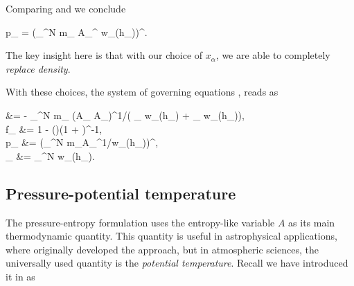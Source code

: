 \documentclass[../main.tex]{subfiles}
\begin{document}
Comparing  and  we conclude

\begin{equations}[single,!,numberline=all]
	\label{eq:PRESSURE-ENTROPY-PRESSURE}
	p_{\alpha} = \left(\sum_{}^N m_{\beta} A_{\beta}^{} w_{\alpha\beta}(h_{\alpha})\right)^{\gamma}.
\end{equations}

The key insight here is that with our choice of $x_{\alpha}$, we are able to completely \emph{replace density}.

With these choices, the system of governing equations ,  reads as

\begin{equations}[columns,!,numberline=all]
	\label{eq:PRESSURE-ENTROPY-TOTAL}
	 &= - \sum_{}^N m_{\beta} \left(A_{\alpha} A_{\beta}\right)^{1/\gamma}\left( \nabla_{\alpha} w_{\alpha\beta}\left(h_{\alpha}\right) +  \nabla_{\alpha} w_{\alpha\beta}\left(h_{\beta}\right)\right), \\
	f_{\alpha \beta} &= 1 - \left(\right)\left(1 + \right)^{-1}, \\
	p_{\alpha} &= \left(\sum_{}^N m_{\beta}A_{\beta}^{1/\gamma}w_{\alpha \beta}\left(h_{\alpha}\right)\right)^{\gamma}, \\
	_{\alpha} &= \sum_{}^N w_{\alpha \beta}\left(h_{\alpha}\right).
\end{equations}

\subsection{Pressure-potential temperature}
\label{sec:DI-pressure-theta}

The pressure-entropy formulation  uses the entropy-like variable $A$ as its main thermodynamic quantity. This quantity is useful in astrophysical applications, where \autocite{hopkinsGeneralClassLagrangian2013a} originally developed the approach, but in atmospheric sciences, the universally used quantity is the \emph{potential temperature}. Recall we have introduced it in  as 
\end{document}
